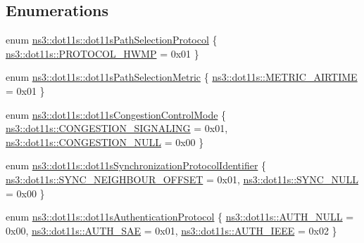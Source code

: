 \subsection*{Enumerations}
\begin{DoxyCompactItemize}
\item 
enum \hyperlink{namespacens3_1_1dot11s_a0d1bf7753c746323a05091844fc055f9}{ns3\+::dot11s\+::dot11s\+Path\+Selection\+Protocol} \{ \hyperlink{namespacens3_1_1dot11s_a0d1bf7753c746323a05091844fc055f9a92d76049fec36f0e9ada1a069f1ada9c}{ns3\+::dot11s\+::\+P\+R\+O\+T\+O\+C\+O\+L\+\_\+\+H\+W\+MP} = 0x01
 \}
\item 
enum \hyperlink{namespacens3_1_1dot11s_add870a70d1c8eef99d450ca9e0c51323}{ns3\+::dot11s\+::dot11s\+Path\+Selection\+Metric} \{ \hyperlink{namespacens3_1_1dot11s_add870a70d1c8eef99d450ca9e0c51323a9c9cbe8f5b372ed53e43f6792eec984c}{ns3\+::dot11s\+::\+M\+E\+T\+R\+I\+C\+\_\+\+A\+I\+R\+T\+I\+ME} = 0x01
 \}
\item 
enum \hyperlink{namespacens3_1_1dot11s_ad20738249c71cb28b1ef0acad0ceca0a}{ns3\+::dot11s\+::dot11s\+Congestion\+Control\+Mode} \{ \hyperlink{namespacens3_1_1dot11s_ad20738249c71cb28b1ef0acad0ceca0aa43e53555a9e432de4cc097d6276632fb}{ns3\+::dot11s\+::\+C\+O\+N\+G\+E\+S\+T\+I\+O\+N\+\_\+\+S\+I\+G\+N\+A\+L\+I\+NG} = 0x01, 
\hyperlink{namespacens3_1_1dot11s_ad20738249c71cb28b1ef0acad0ceca0aac18d5e374127a9664e6a899493a33bd3}{ns3\+::dot11s\+::\+C\+O\+N\+G\+E\+S\+T\+I\+O\+N\+\_\+\+N\+U\+LL} = 0x00
 \}
\item 
enum \hyperlink{namespacens3_1_1dot11s_a31fab993af76c062ff93945bdcb3f599}{ns3\+::dot11s\+::dot11s\+Synchronization\+Protocol\+Identifier} \{ \hyperlink{namespacens3_1_1dot11s_a31fab993af76c062ff93945bdcb3f599a5994898e23063f204fcc6165e990bec5}{ns3\+::dot11s\+::\+S\+Y\+N\+C\+\_\+\+N\+E\+I\+G\+H\+B\+O\+U\+R\+\_\+\+O\+F\+F\+S\+ET} = 0x01, 
\hyperlink{namespacens3_1_1dot11s_a31fab993af76c062ff93945bdcb3f599a76aa762b344c94aa7877ce5c2a7b53ef}{ns3\+::dot11s\+::\+S\+Y\+N\+C\+\_\+\+N\+U\+LL} = 0x00
 \}
\item 
enum \hyperlink{namespacens3_1_1dot11s_abdbcad7f88fa5bc91accac0865e18f25}{ns3\+::dot11s\+::dot11s\+Authentication\+Protocol} \{ \hyperlink{namespacens3_1_1dot11s_abdbcad7f88fa5bc91accac0865e18f25a091970dc1b34507565a41a561f499c77}{ns3\+::dot11s\+::\+A\+U\+T\+H\+\_\+\+N\+U\+LL} = 0x00, 
\hyperlink{namespacens3_1_1dot11s_abdbcad7f88fa5bc91accac0865e18f25ace73fb82a908e67b6e663feeb5c2eb49}{ns3\+::dot11s\+::\+A\+U\+T\+H\+\_\+\+S\+AE} = 0x01, 
\hyperlink{namespacens3_1_1dot11s_abdbcad7f88fa5bc91accac0865e18f25a4887dc6a1e26a2bc326da1c57b36c928}{ns3\+::dot11s\+::\+A\+U\+T\+H\+\_\+\+I\+E\+EE} = 0x02
 \}
\end{DoxyCompactItemize}
